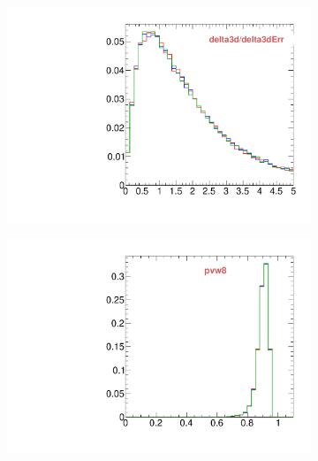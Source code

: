 \begin{figure}
\begin{subfigure}[b]{0.2\textwidth}
                \includegraphics[width=\textwidth]{Figures/VariablesComparison/Data_endcaps_figs_3h/delta3d/delta3dErr}
                \label{fig:Data_endcaps_delta3d/delta3dErr_3h}
        \end{subfigure}
        \begin{subfigure}[b]{0.2\textwidth}
                \centering
                \includegraphics[width=\textwidth]{Figures/VariablesComparison/Data_endcaps_figs_3h/pvw8}
                \label{fig:Data_endcaps_pvw8_3h}
        \end{subfigure}
        \begin{subfigure}[b]{0.2\textwidth}
                \centering

\end{subfigure}
\end{figure}
